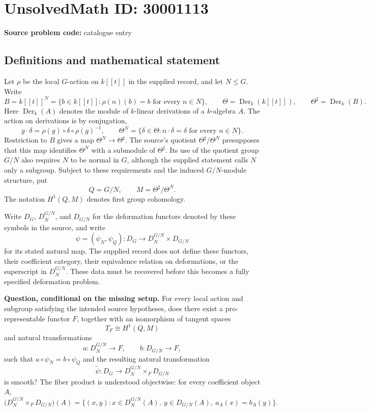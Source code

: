 \documentclass[11pt]{article}
\begin{document}
\section*{UnsolvedMath ID: 30001113}
\textbf{Source problem code:} catalogue entry
\subsection{Definitions and mathematical statement}
Let \(\rho\) be the local \(G\)-action on \(k[[t]]\) in the supplied record, and let \(N\leq G\). Write
\[
B=k[[t]]^N=\{b\in k[[t]]:\rho(n)(b)=b\text{ for every }n\in N\},
\qquad
\Theta=\operatorname{Der}_k(k[[t]]),\qquad
\Theta^\sharp=\operatorname{Der}_k(B).
\]
Here \(\operatorname{Der}_k(A)\) denotes the module of \(k\)-linear derivations of a \(k\)-algebra \(A\). The action on derivations is by conjugation,
\[
g\cdot\delta=\rho(g)\circ\delta\circ\rho(g)^{-1},
\qquad
\Theta^N=\{\delta\in\Theta:n\cdot\delta=\delta\text{ for every }n\in N\}.
\]
Restriction to \(B\) gives a map \(\Theta^N\to\Theta^\sharp\). The source's quotient \(\Theta^\sharp/\Theta^N\) presupposes that this map identifies \(\Theta^N\) with a submodule of \(\Theta^\sharp\). Its use of the quotient group \(G/N\) also requires \(N\) to be normal in \(G\), although the supplied statement calls \(N\) only a subgroup. Subject to these requirements and the induced \(G/N\)-module structure, put
\[
Q=G/N,\qquad M=\Theta^\sharp/\Theta^N.
\]
The notation \(H^1(Q,M)\) denotes first group cohomology.

Write \(D_G\), \(D_N^{G/N}\), and \(D_{G/N}\) for the deformation functors denoted by these symbols in the source, and write
\[
\psi=(\psi_N,\psi_Q):D_G\longrightarrow D_N^{G/N}\times D_{G/N}
\]
for its stated natural map. The supplied record does not define these functors, their coefficient category, their equivalence relation on deformations, or the superscript in \(D_N^{G/N}\). These data must be recovered before this becomes a fully specified deformation problem.

\textbf{Question, conditional on the missing setup.} For every local action and subgroup satisfying the intended source hypotheses, does there exist a pro-representable functor \(F\), together with an isomorphism of tangent spaces
\[
T_F\cong H^1(Q,M)
\]
and natural transformations
\[
a:D_N^{G/N}\longrightarrow F,
\qquad b:D_{G/N}\longrightarrow F,
\]
such that \(a\circ\psi_N=b\circ\psi_Q\) and the resulting natural transformation
\[
\widetilde\psi:D_G\longrightarrow D_N^{G/N}\times_F D_{G/N}
\]
is smooth? The fiber product is understood objectwise: for every coefficient object \(A\),
\[
\bigl(D_N^{G/N}\times_F D_{G/N}\bigr)(A)
=\{(x,y):x\in D_N^{G/N}(A),\ y\in D_{G/N}(A),\ a_A(x)=b_A(y)\}.
\]
\end{document}

